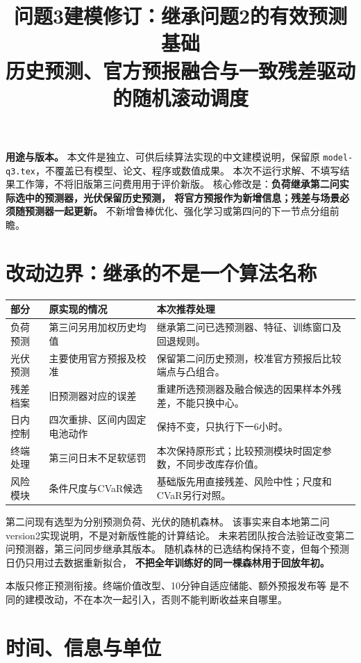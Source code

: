 \documentclass[UTF8,11pt]{ctexart}
\title{问题3建模修订：继承问题2的有效预测基础\\
{\large 历史预测、官方预报融合与一致残差驱动的随机滚动调度}}
\author{}
\date{}
\begin{document}
\maketitle

\noindent\textbf{用途与版本。}
本文件是独立、可供后续算法实现的中文建模说明，保留原
\texttt{model-q3.tex}，不覆盖已有模型、论文、程序或数值成果。
本次不运行求解、不填写结果工作簿，不将旧版第三问费用用于评价新版。
核心修改是：\textbf{负荷继承第二问实际选中的预测器，光伏保留历史预测，
将官方预报作为新增信息；残差与场景必须随预测器一起更新。}
不新增鲁棒优化、强化学习或第四问的下一节点分组前瞻。

\section{改动边界：继承的不是一个算法名称}
\begin{longtable}{p{2.3cm}p{5.3cm}p{6.2cm}}
\toprule 部分 & 原实现的情况 & 本次推荐处理\\ \midrule
\endhead
负荷预测 & 第三问另用加权历史均值 & 继承第二问已选预测器、特征、训练窗口及回退规则。\\
光伏预测 & 主要使用官方预报及校准 & 保留第二问历史预测，校准官方预报后比较端点与凸组合。\\
残差档案 & 旧预测器对应的误差 & 重建所选预测器及融合候选的因果样本外残差，不能只换中心。\\
日内控制 & 四次重排、区间内固定电池动作 & 保持不变，只执行下一6小时。\\
终端处理 & 第三问日末不足软惩罚 & 本次保持原形式；比较预测模块时固定参数，不同步改库存价值。\\
风险模块 & 条件尺度与CVaR候选 & 基础版先用直接残差、风险中性；尺度和CVaR另行对照。\\
\bottomrule
\end{longtable}

第二问现有选型为分别预测负荷、光伏的随机森林。
该事实来自本地第二问version2实现说明，不是对新版性能的计算结论。
未来若团队按合法验证改变第二问预测器，第三问同步继承其版本。
随机森林的已选结构保持不变，但每个预测日仍只用过去数据重新拟合，
\textbf{不把全年训练好的同一棵森林用于回放年初。}

本版只修正预测衔接。终端价值改型、10分钟自适应储能、额外预报发布等
是不同的建模改动，不在本次一起引入，否则不能判断收益来自哪里。

\section{时间、信息与单位}
\end{document}
